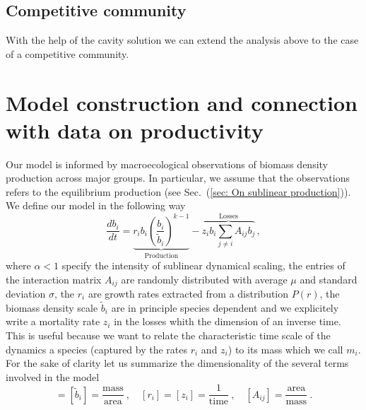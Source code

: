 \documentclass[10pt]{article}
\begin{document}
\subsection{Competitive community}
With the help of the cavity solution we can extend the analysis above
to the case of a competitive community.

\section{Model construction and connection with data on productivity}
Our model is informed by macroecological observations
of biomass density production across major groups.
In particular, we assume that the observations refers to the
equilibrium production (see Sec.~(\ref{sec: On sublinear production})).
We define our model in the following way
\begin{equation}
    \frac{d b_i}{dt} = \underbrace{r_ib_i\left(\frac{b_i}{\tilde{b}_i}\right)^{k -1}}_\text{Production}
     - \overbrace{z_ib_i\sum_{j\neq i}A_{ij}b_j}^\text{Losses} \, ,
\end{equation}
where $\alpha<1$
specify the intensity of sublinear dynamical scaling,
the entries of the interaction matrix $A_{ij}$
are randomly distributed with average $\mu$ and standard deviation $\sigma$,
the $r_i$ are growth rates extracted from a distribution
$P(r)$, the biomass density scale
$\tilde{b}_i$ are in principle species dependent
and we explicitely write a mortality rate $z_i$ in the losses whith the dimension
of an inverse time. This is useful because we want to relate the characteristic time scale 
of the dynamics a species (captured by
the rates $r_i$ and $z_i$) to its mass which we call $m_i$.
For the sake of clarity let us summarize the dimensionality of
the several terms involved in the model
\begin{equation}
    [b_i] = [\tilde{b}_i] =  \frac{\textrm{mass}}{\textrm{area}} \ , \quad [r_i]=[z_i]=\frac{1}{\textrm{time}} \ , 
    \quad [A_{ij}]=\frac{\textrm{area}}{\textrm{mass}} \ .
\end{equation}
\end{document}
